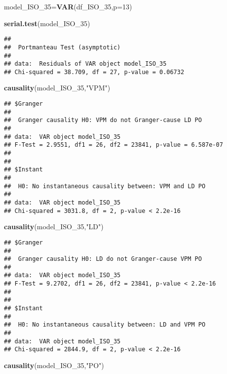 \documentclass[
]{article}
\newenvironment{Shaded}{\begin{snugshade}}{\end{snugshade}}
\newcommand{\AttributeTok}[1]{\textcolor[rgb]{0.13,0.29,0.53}{#1}}
\newcommand{\DecValTok}[1]{\textcolor[rgb]{0.00,0.00,0.81}{#1}}
\newcommand{\FunctionTok}[1]{\textcolor[rgb]{0.13,0.29,0.53}{\textbf{#1}}}
\newcommand{\NormalTok}[1]{#1}
\newcommand{\OtherTok}[1]{\textcolor[rgb]{0.56,0.35,0.01}{#1}}
\newcommand{\StringTok}[1]{\textcolor[rgb]{0.31,0.60,0.02}{#1}}
\begin{document}
\begin{Shaded}
\begin{Highlighting}[]
\NormalTok{model\_ISO\_35}\OtherTok{=}\FunctionTok{VAR}\NormalTok{(df\_ISO\_35,}\AttributeTok{p=}\DecValTok{13}\NormalTok{)}

\FunctionTok{serial.test}\NormalTok{(model\_ISO\_35)}
\end{Highlighting}
\end{Shaded}

\begin{verbatim}
## 
##  Portmanteau Test (asymptotic)
## 
## data:  Residuals of VAR object model_ISO_35
## Chi-squared = 38.709, df = 27, p-value = 0.06732
\end{verbatim}

\begin{Shaded}
\begin{Highlighting}[]
\FunctionTok{causality}\NormalTok{(model\_ISO\_35,}\StringTok{"VPM"}\NormalTok{)}
\end{Highlighting}
\end{Shaded}

\begin{verbatim}
## $Granger
## 
##  Granger causality H0: VPM do not Granger-cause LD PO
## 
## data:  VAR object model_ISO_35
## F-Test = 2.9551, df1 = 26, df2 = 23841, p-value = 6.587e-07
## 
## 
## $Instant
## 
##  H0: No instantaneous causality between: VPM and LD PO
## 
## data:  VAR object model_ISO_35
## Chi-squared = 3031.8, df = 2, p-value < 2.2e-16
\end{verbatim}

\begin{Shaded}
\begin{Highlighting}[]
\FunctionTok{causality}\NormalTok{(model\_ISO\_35,}\StringTok{"LD"}\NormalTok{)}
\end{Highlighting}
\end{Shaded}

\begin{verbatim}
## $Granger
## 
##  Granger causality H0: LD do not Granger-cause VPM PO
## 
## data:  VAR object model_ISO_35
## F-Test = 9.2702, df1 = 26, df2 = 23841, p-value < 2.2e-16
## 
## 
## $Instant
## 
##  H0: No instantaneous causality between: LD and VPM PO
## 
## data:  VAR object model_ISO_35
## Chi-squared = 2844.9, df = 2, p-value < 2.2e-16
\end{verbatim}

\begin{Shaded}
\begin{Highlighting}[]
\FunctionTok{causality}\NormalTok{(model\_ISO\_35,}\StringTok{"PO"}\NormalTok{)}
\end{Highlighting}
\end{Shaded}
\end{document}
